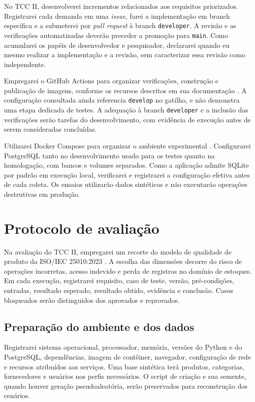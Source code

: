 No TCC II, desenvolverei incrementos relacionados aos requisitos priorizados. Registrarei cada demanda em uma \textit{issue}, farei a implementação em branch específica e a submeterei por \textit{pull request} à branch \texttt{developer}. A revisão e as verificações automatizadas deverão preceder a promoção para \texttt{main}. Como acumularei os papéis de desenvolvedor e pesquisador, declararei quando eu mesmo realizar a implementação e a revisão, sem caracterizar essa revisão como independente.

Empregarei o GitHub Actions para organizar verificações, construção e publicação de imagens, conforme os recursos descritos em sua documentação \cite{GitHubActionsDocs,GitHubContainerRegistry}. A configuração consultada ainda referencia \texttt{develop} no gatilho, e não demonstra uma etapa dedicada de testes. A adequação à branch \texttt{developer} e a inclusão das verificações serão tarefas do desenvolvimento, com evidência de execução antes de serem consideradas concluídas.

Utilizarei Docker Compose para organizar o ambiente experimental \cite{DockerComposeDocs}. Configurarei PostgreSQL tanto no desenvolvimento usado para os testes quanto na homologação, com bancos e volumes separados. Como a aplicação admite SQLite por padrão em execução local, verificarei e registrarei a configuração efetiva antes de cada coleta. Os ensaios utilizarão dados sintéticos e não executarão operações destrutivas em produção.

\section{Protocolo de avaliação}
\label{sec:protocolo}

Na avaliação do TCC II, empregarei um recorte do modelo de qualidade de produto da ISO/IEC 25010:2023 \cite{ISO25010_2023}. A escolha das dimensões decorre do risco de operações incorretas, acesso indevido e perda de registros no domínio de estoques. Em cada execução, registrarei requisito, caso de teste, versão, pré-condições, entradas, resultado esperado, resultado obtido, evidência e conclusão. Casos bloqueados serão distinguidos dos aprovados e reprovados.

\subsection{Preparação do ambiente e dos dados}

Registrarei sistema operacional, processador, memória, versões do Python e do PostgreSQL, dependências, imagem de contêiner, navegador, configuração de rede e recursos atribuídos aos serviços. Uma base sintética terá produtos, categorias, fornecedores e usuários nos perfis necessários. O script de criação e sua semente, quando houver geração pseudoaleatória, serão preservados para reconstrução dos cenários.

